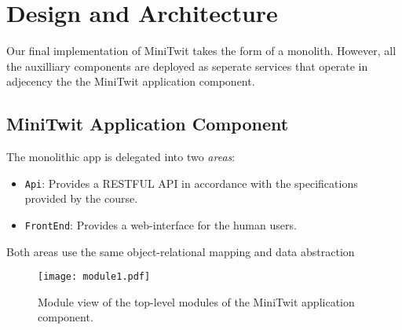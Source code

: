 \section{Design and Architecture}\label{sec:design-arch}

Our final implementation of MiniTwit takes the form of a monolith.%
However, all the auxilliary components are deployed as seperate services that operate in adjecency the the MiniTwit application component.

\subsection{MiniTwit Application Component}

The monolithic app is delegated into two \textit{areas}:%

\begin{itemize}
	\item \texttt{Api}: Provides a RESTFUL API in accordance with the specifications provided by the course. %
	\item \texttt{FrontEnd}: Provides a web-interface for the human users.%
\end{itemize}

Both areas use the same object-relational mapping and data abstraction%

\begin{figure}
	\begin{center}
		\texttt{[image: module1.pdf]}
	\end{center}
	\caption{Module view of the top-level modules of the MiniTwit application component.}\label{fig:module1}
\end{figure}



